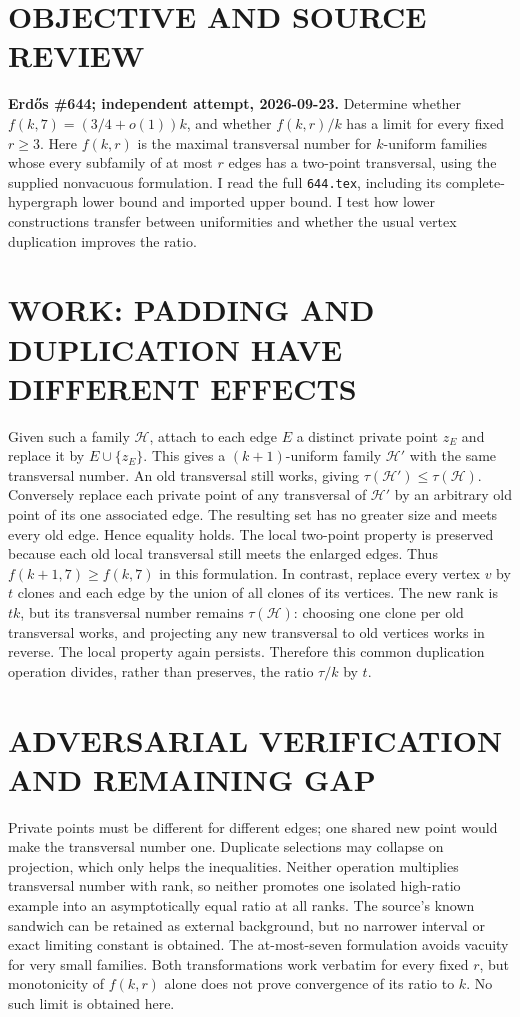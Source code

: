 \section{OBJECTIVE AND SOURCE REVIEW}
\textbf{Erd\H{o}s \#644; independent attempt, 2026-09-23.}
Determine whether $f(k,7)=(3/4+o(1))k$, and whether $f(k,r)/k$ has a limit for every fixed $r\ge3$. Here $f(k,r)$ is the maximal transversal number for $k$-uniform families whose every subfamily of at most $r$ edges has a two-point transversal, using the supplied nonvacuous formulation. I read the full \texttt{644.tex}, including its complete-hypergraph lower bound and imported upper bound. I test how lower constructions transfer between uniformities and whether the usual vertex duplication improves the ratio.
\section{WORK: PADDING AND DUPLICATION HAVE DIFFERENT EFFECTS}
Given such a family $\mathcal H$, attach to each edge $E$ a distinct private point $z_E$ and replace it by $E\cup\{z_E\}$. This gives a $(k+1)$-uniform family $\mathcal H'$ with the same transversal number. An old transversal still works, giving $\tau(\mathcal H')\le\tau(\mathcal H)$. Conversely replace each private point of any transversal of $\mathcal H'$ by an arbitrary old point of its one associated edge. The resulting set has no greater size and meets every old edge. Hence equality holds. The local two-point property is preserved because each old local transversal still meets the enlarged edges. Thus $f(k+1,7)\ge f(k,7)$ in this formulation.
In contrast, replace every vertex $v$ by $t$ clones and each edge by the union of all clones of its vertices. The new rank is $tk$, but its transversal number remains $\tau(\mathcal H)$: choosing one clone per old transversal works, and projecting any new transversal to old vertices works in reverse. The local property again persists. Therefore this common duplication operation divides, rather than preserves, the ratio $\tau/k$ by $t$.
\section{ADVERSARIAL VERIFICATION AND REMAINING GAP}
Private points must be different for different edges; one shared new point would make the transversal number one. Duplicate selections may collapse on projection, which only helps the inequalities. Neither operation multiplies transversal number with rank, so neither promotes one isolated high-ratio example into an asymptotically equal ratio at all ranks. The source's known sandwich can be retained as external background, but no narrower interval or exact limiting constant is obtained. The at-most-seven formulation avoids vacuity for very small families.
Both transformations work verbatim for every fixed $r$, but monotonicity of $f(k,r)$ alone does not prove convergence of its ratio to $k$. No such limit is obtained here.
